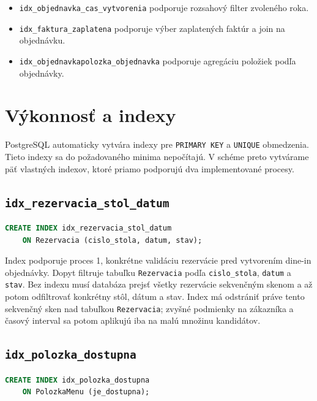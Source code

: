 \documentclass[11pt, a4paper]{article}
\begin{document}
\begin{itemize}
    \item \texttt{idx\_objednavka\_cas\_vytvorenia} podporuje rozsahový filter zvoleného roka.
    \item \texttt{idx\_faktura\_zaplatena} podporuje výber zaplatených faktúr a join na objednávku.
    \item \texttt{idx\_objednavkapolozka\_objednavka} podporuje agregáciu položiek podľa objednávky.
\end{itemize}

\section{Výkonnosť a indexy}

PostgreSQL automaticky vytvára indexy pre \texttt{PRIMARY KEY} a \texttt{UNIQUE} obmedzenia.
Tieto indexy sa do požadovaného minima nepočítajú. V schéme preto vytvárame päť vlastných
indexov, ktoré priamo podporujú dva implementované procesy.

\subsection*{\texttt{idx\_rezervacia\_stol\_datum}}

\begin{lstlisting}[language=SQL]
CREATE INDEX idx_rezervacia_stol_datum
    ON Rezervacia (cislo_stola, datum, stav);
\end{lstlisting}

Index podporuje proces 1, konkrétne validáciu rezervácie pred vytvorením dine-in objednávky.
Dopyt filtruje tabuľku \texttt{Rezervacia} podľa \texttt{cislo\_stola}, \texttt{datum} a
\texttt{stav}. Bez indexu musí databáza prejsť všetky rezervácie sekvenčným skenom a až potom
odfiltrovať konkrétny stôl, dátum a stav. Index má odstrániť práve tento sekvenčný sken nad
tabuľkou \texttt{Rezervacia}; zvyšné podmienky na zákazníka a časový interval sa potom aplikujú
iba na malú množinu kandidátov.

\subsection*{\texttt{idx\_polozka\_dostupna}}

\begin{lstlisting}[language=SQL]
CREATE INDEX idx_polozka_dostupna
    ON PolozkaMenu (je_dostupna);
\end{lstlisting}
\end{document}
